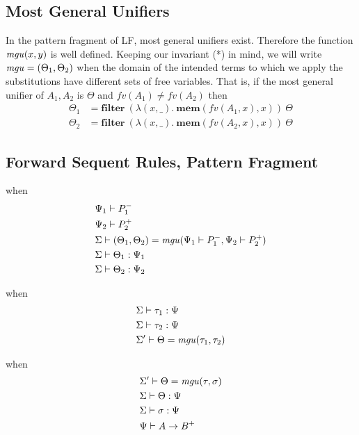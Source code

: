 \subsection{Most General Unifiers}
In the pattern fragment of LF, most general unifiers exist.  Therefore the
function $\mgu(x,y)$ is well defined.  Keeping our invariant (*) in mind, 
we will write $\mgu = (\Theta_1,\Theta_2)$ when the domain of the intended
terms to which we apply the substitutions have different sets of free variables.
That is, if the most general unifier of $A_1,A_2$ is $\Theta$ and 
$fv(A_1) \neq fv(A_2)$ then 
\begin{align*} 
  \Theta_1 &= \mathbf{filter}\ (\lambda(x,\_).\ \mathbf{mem}(fv(A_1,x),x))\ \Theta \\ 
  \Theta_2 &= \mathbf{filter}\ (\lambda(x,\_).\ \mathbf{mem}(fv(A_2,x),x))\ \Theta
\end{align*} 


\subsection{Forward Sequent Rules, Pattern Fragment}

when
\begin{align*} 
  &\NSubform[\Psi_1]{P_1}\\
  &\PSubform[\Psi_2]{P_2}\\
  &\MGU{(\Theta_1,\Theta_2)}{\NSubform[\Psi_1]{P_1}}{\PSubform[\Psi_2]{P_2}}\\
  &\AdmSub{\Theta_1}{\Psi_1}\\
  &\AdmSub{\Theta_2}{\Psi_2}
\end{align*} 

                         {}
when
\begin{align*} 
  &\AdmSub{\tau_1}{\Psi}\\
  &\AdmSub{\tau_2}{\Psi}\\  
  &\MGU[\Sigma']{\Theta}{\tau_1}{\tau_2}
\end{align*} 

                       {}
when 
\begin{align*} 
  &\MGU[\Sigma']{\Theta}{\tau}{\sigma} \\
  &\AdmSub{\Theta}{\Psi} \\
  &\AdmSub{\sigma}{\Psi}\\
  &\PSubform{A \LFArrow B}
\end{align*} 

